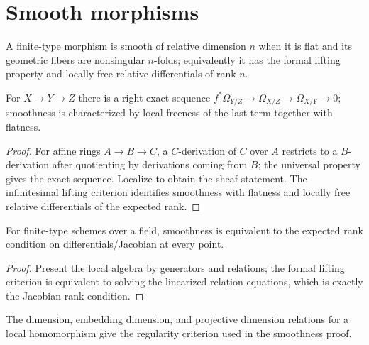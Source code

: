 \section{Smooth morphisms}
\label{ha-ch3-sec10}
\begin{definition}\label{ha-ch3-def-smooth}
A finite-type morphism is smooth of relative dimension $n$ when it is flat and
its geometric fibers are nonsingular $n$-folds; equivalently it has the formal
lifting property and locally free relative differentials of rank $n$.
\end{definition}
\begin{proposition}[Differentials]\label{ha-ch3-prop-differentials}
For $X\to Y\to Z$ there is a right-exact sequence
$f^*\Omega_{Y/Z}\to\Omega_{X/Z}\to\Omega_{X/Y}\to0$; smoothness is
characterized by local freeness of the last term together with flatness.

\end{proposition}
\begin{proof}

For affine rings $A\to B\to C$, a $C$-derivation of $C$ over $A$ restricts to a $B$-derivation after
quotienting by derivations coming from $B$; the universal property gives the exact sequence.  Localize
to obtain the sheaf statement.  The infinitesimal lifting criterion identifies smoothness with
flatness and locally free relative differentials of the expected rank.

\end{proof}
\begin{theorem}\label{ha-ch3-thm-jacobian}
For finite-type schemes over a field, smoothness is equivalent to the expected
rank condition on differentials/Jacobian at every point.

\end{theorem}
\begin{proof}
Present the local algebra by generators and relations; the formal
lifting criterion is equivalent to solving the linearized relation equations,
which is exactly the Jacobian rank condition.
\end{proof}
\begin{lemma}\label{ha-ch3-lem-regular-local}
The dimension, embedding dimension, and projective dimension relations for a
local homomorphism give the regularity criterion used in the smoothness proof.

\end{lemma}
